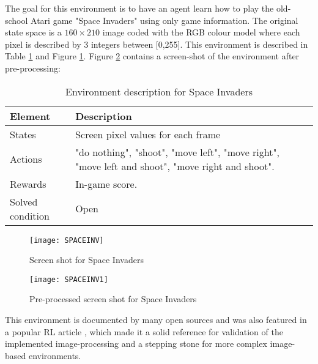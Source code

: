 \documentclass[journal]{IEEEtran}
\begin{document}
		The goal for this environment is to have an agent learn how to play the old-school Atari game "Space Invaders" using only game information. The original state space is a $160\times210$ image coded with the RGB colour model where each pixel is described by 3 integers between [0,255]. This environment is described in Table \ref{table:ENV2} and Figure \ref{fig:ENV2}. Figure \ref{fig:ENV2.1} contains a screen-shot of the environment after pre-processing:
	
		\begin{table}[ht]
			\centering
			
			\begin{tabular}{ m{2.5cm} || m{5cm}}
			
				Element & Description \\
			
				\hline \hline
				States & Screen pixel values for each frame \\
			
				\hline
				Actions & "do nothing", "shoot", "move left", "move right", "move left and shoot", "move right and shoot".\\
			
				\hline
				Rewards & In-game score. \\
				
				\hline
				Solved condition & Open \\	
			
			\end{tabular}
			
			\caption{Environment description for Space Invaders}
			\label{table:ENV2}
		\end{table}
		
		\begin{figure}[ht]
			\hfill\texttt{[image: SPACEINV]}\hspace*{\fill}
			\caption{Screen shot for Space Invaders}
			\label{fig:ENV2}
		\end{figure}
		
		\begin{figure}[ht]
			\hfill\texttt{[image: SPACEINV1]}\hspace*{\fill}
			\caption{Pre-processed screen shot for Space Invaders}
			\label{fig:ENV2.1}
		\end{figure}
		
	This environment is documented by many open sources and was also featured in a popular RL article \cite{Nature_DQN-SI}, which made it a solid reference for validation of the implemented image-processing and a stepping stone for more complex image-based environments.	
	
\end{document}
